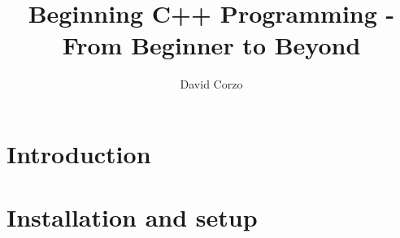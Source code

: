 \documentclass[openany]{book}
\title{Beginning C++ Programming - From Beginner to Beyond}
\date{}
\author{David Corzo}
\begin{document}
\maketitle
\tableofcontents

\chapter{Introduction}


\chapter{Installation and setup}


% 

% 

% 

% 

% 

% 

% 
\end{document}
